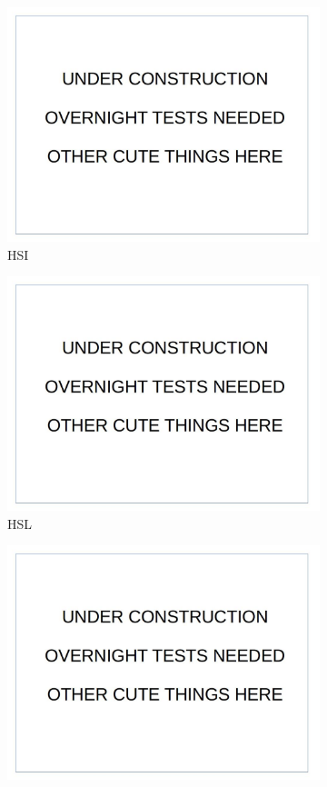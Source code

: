 \documentclass[12pt]{report}
\begin{document}
\begin{figure}
\begin{subfigure}{.49\linewidth}
  \includegraphics[width=1\linewidth]{figures/placeholder.jpg}
  \caption{HSI}
\end{subfigure}
\hfill
\begin{subfigure}{.49\linewidth}
  \includegraphics[width=1\linewidth]{figures/placeholder.jpg}
  \caption{HSL}
\end{subfigure}
\hfill
\begin{subfigure}{.49\linewidth}
  \includegraphics[width=1\linewidth]{figures/placeholder.jpg}

\end{subfigure}
\end{figure}
\end{document}
